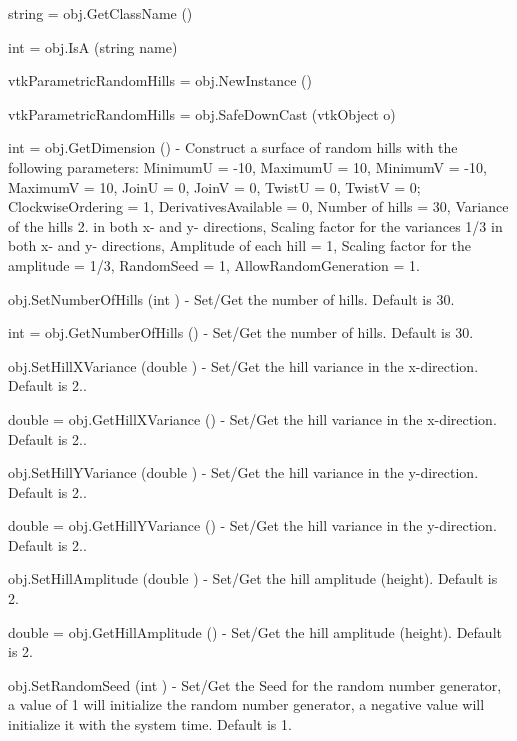 \begin{DoxyItemize}
\item {\ttfamily string = obj.\-Get\-Class\-Name ()}  
\item {\ttfamily int = obj.\-Is\-A (string name)}  
\item {\ttfamily vtk\-Parametric\-Random\-Hills = obj.\-New\-Instance ()}  
\item {\ttfamily vtk\-Parametric\-Random\-Hills = obj.\-Safe\-Down\-Cast (vtk\-Object o)}  
\item {\ttfamily int = obj.\-Get\-Dimension ()} -\/ Construct a surface of random hills with the following parameters\-: Minimum\-U = -\/10, Maximum\-U = 10, Minimum\-V = -\/10, Maximum\-V = 10, Join\-U = 0, Join\-V = 0, Twist\-U = 0, Twist\-V = 0; Clockwise\-Ordering = 1, Derivatives\-Available = 0, Number of hills = 30, Variance of the hills 2. in both x-\/ and y-\/ directions, Scaling factor for the variances 1/3 in both x-\/ and y-\/ directions, Amplitude of each hill = 1, Scaling factor for the amplitude = 1/3, Random\-Seed = 1, Allow\-Random\-Generation = 1.  
\item {\ttfamily obj.\-Set\-Number\-Of\-Hills (int )} -\/ Set/\-Get the number of hills. Default is 30.  
\item {\ttfamily int = obj.\-Get\-Number\-Of\-Hills ()} -\/ Set/\-Get the number of hills. Default is 30.  
\item {\ttfamily obj.\-Set\-Hill\-X\-Variance (double )} -\/ Set/\-Get the hill variance in the x-\/direction. Default is 2..  
\item {\ttfamily double = obj.\-Get\-Hill\-X\-Variance ()} -\/ Set/\-Get the hill variance in the x-\/direction. Default is 2..  
\item {\ttfamily obj.\-Set\-Hill\-Y\-Variance (double )} -\/ Set/\-Get the hill variance in the y-\/direction. Default is 2..  
\item {\ttfamily double = obj.\-Get\-Hill\-Y\-Variance ()} -\/ Set/\-Get the hill variance in the y-\/direction. Default is 2..  
\item {\ttfamily obj.\-Set\-Hill\-Amplitude (double )} -\/ Set/\-Get the hill amplitude (height). Default is 2.  
\item {\ttfamily double = obj.\-Get\-Hill\-Amplitude ()} -\/ Set/\-Get the hill amplitude (height). Default is 2.  
\item {\ttfamily obj.\-Set\-Random\-Seed (int )} -\/ Set/\-Get the Seed for the random number generator, a value of 1 will initialize the random number generator, a negative value will initialize it with the system time. Default is 1.  

\end{DoxyItemize}

